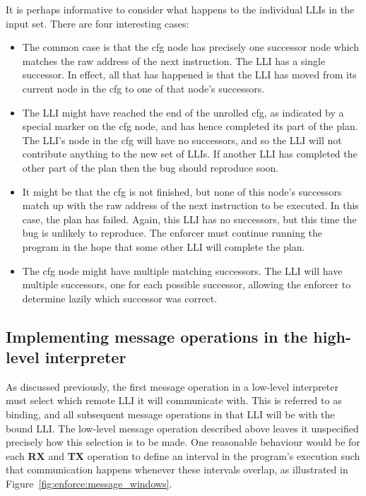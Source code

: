 It is perhaps informative to consider what happens to the individual
LLIs in the input set.  There are four interesting cases:

\begin{itemize}
\item The common case is that the \gls{cfg} node has precisely one successor
  node which matches the raw address of the next instruction.  The LLI
  has a single successor.  In effect, all that has happened is that
  the LLI has moved from its current node in the \gls{cfg} to one of that
  node's successors.

\item The LLI might have reached the end of the unrolled \gls{cfg}, as
  indicated by a special marker on the \gls{cfg} node, and has hence
  completed its part of the plan.  The LLI's node in the \gls{cfg} will have
  no successors, and so the LLI will not contribute anything to the
  new set of LLIs.  If another LLI has completed the other part of the
  plan then the bug should reproduce soon.

\item It might be that the \gls{cfg} is not finished, but none of this
  node's successors match up with the raw address of the next
  instruction to be executed.  In this case, the plan has failed.
  Again, this LLI has no successors, but this time the bug is unlikely
  to reproduce.  The enforcer must continue running the program in the
  hope that some other LLI will complete the plan.

\item The \gls{cfg} node might have multiple matching successors.  The LLI
  will have multiple successors, one for each possible successor,
  allowing the enforcer to determine lazily which successor was
  correct.
\end{itemize}

\subsection{Implementing message operations in the high-level interpreter}
\label{sect:enforce:hli_messages}

As discussed previously, the first message operation in a low-level
interpreter must select which remote LLI it will communicate with.
This is referred to as binding, and all subsequent message operations
in that LLI will be with the bound LLI.  The low-level message
operation described above leaves it unspecified precisely how this
selection is to be made.  One reasonable behaviour would be for each
\textbf{RX} and \textbf{TX} operation to define an interval in the
program's execution such that communication happens whenever these
intervals overlap, as illustrated in
Figure~\ref{fig:enforce:message_windows}.

